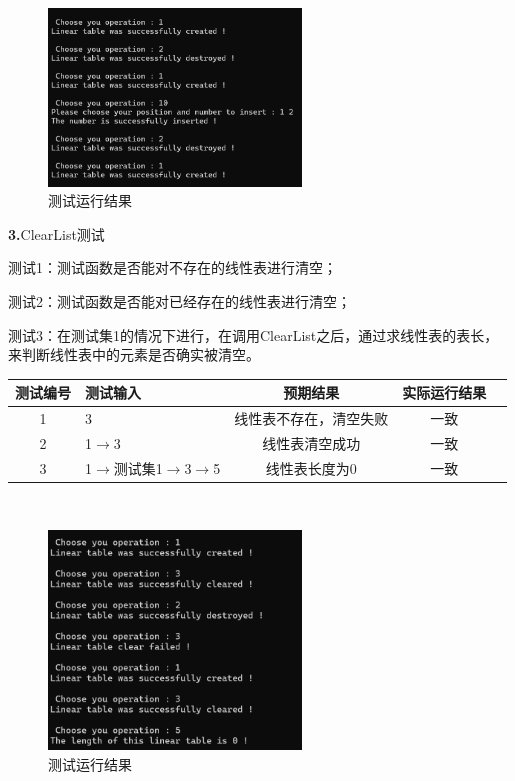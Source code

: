 \documentclass[supercite]{Experimental_Report}
\theoremstyle{definition}
\begin{document}
~\

 \begin{figure}[H]
 	\centering
 	\includegraphics[width=0.6\textwidth]{images/线性表测试2.png}
 	\caption{测试运行结果}
 	\label{txlab}
 \end{figure}


\noindent\textbf{ 3.}ClearList测试

测试1：测试函数是否能对不存在的线性表进行清空；

测试2：测试函数是否能对已经存在的线性表进行清空；

测试3：在测试集1的情况下进行，在调用ClearList之后，通过求线性表的表长，来判断线性表中的元素是否确实被清空。

\vspace{0.5em}

\begin{tabular}{|c|l|c|c|c|}
	\hline
	测试编号 & 测试输入 & 预期结果 & 实际运行结果 \\
	\hline
	1 & 3 & 线性表不存在，清空失败 & 一致 \\
	\hline
	2 & 1$\rightarrow$3 & 线性表清空成功 & 一致 \\
	\hline
	3 & 1$\rightarrow$测试集1$\rightarrow$3$\rightarrow$5 & 线性表长度为0 & 一致 \\
	\hline
\end{tabular}

~\

 \begin{figure}[H]
 	\centering
 	\includegraphics[width=0.6\textwidth]{images/线性表测试3.png}
 	\caption{测试运行结果}
 	\label{txlab}
 \end{figure}
\end{document}
